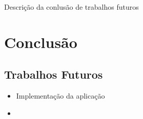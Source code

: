Descrição da conlusão de trabalhos futuros

\section{Conclusão}

\subsection{Trabalhos Futuros}

\begin{itemize}
 \item Implementação da aplicação
 \item 
\end{itemize}
